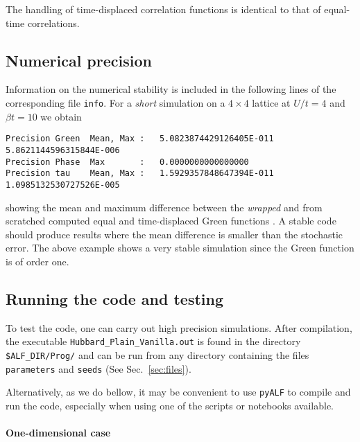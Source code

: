 The handling of time-displaced correlation functions is identical to that of equal-time correlations. 

\subsection{Numerical precision}\label{sec:prec_spin}

Information on the numerical stability is included in the following lines of the corresponding file \texttt{info}. 
For a  \textit{short} simulation on a $4 \times 4$  lattice at $U/t=4$ and $\beta t = 10$  we obtain
\begin{lstlisting}[basicstyle=\ttfamily\small,columns=fullflexible,keepspaces=true]
Precision Green  Mean, Max :   5.0823874429126405E-011  5.8621144596315844E-006
Precision Phase  Max       :   0.0000000000000000    
Precision tau    Mean, Max :   1.5929357848647394E-011  1.0985132530727526E-005 
\end{lstlisting}
showing the mean and maximum difference between the \textit{wrapped}  and from scratched computed equal and time-displaced  Green functions \cite{Assaad08_rev}.
A stable code  should produce results where the mean difference is smaller than the  stochastic error. The above example  shows a very stable simulation since the Green function  is of order one. 

\subsection{Running the code and testing}

To test the code, one can carry out high precision simulations. After compilation, the executable \texttt{Hubbard\_Plain\_Vanilla.out} is found in the directory \texttt{\$ALF\_DIR/Prog/} and can be run from any directory containing the files \texttt{parameters} and \texttt{seeds} (See Sec.~\ref{sec:files}).

Alternatively, as we do bellow, it may be convenient to use \texttt{pyALF} to compile and run the code, especially when using one of the scripts or notebooks available.  

\paragraph*{One-dimensional case} 

